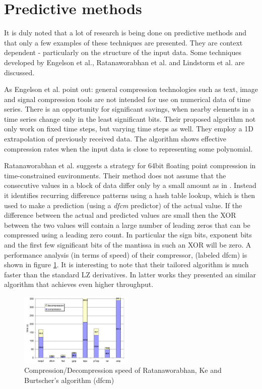 \documentclass{acm_proc_article-sp}
\begin{document}
\section{Predictive methods}
It is duly noted that a lot of research is being done on predictive methods and that only a few examples of these techniques are presented. They are context dependent - particularly on the structure of the input data. Some techniques
developed by Engelson et al., Ratanaworabhan et al. and Lindstorm et al. are discussed.

As Engelson et al. \cite{engelson2000lossless} point out: general compression technologies such as text, image and signal compression tools are not intended for use on numerical data of time 
series. There is an opportunity for significant savings, when nearby elements in a time series change only in the least significant bits. Their proposed
algorithm not only work on fixed time steps, but varying time steps as well. They employ a 1D extrapolation of previously received data. The algorithm shows effective compression 
rates when the input data is close to representing some polynomial.

Ratanaworabhan et al. \cite{1607248} suggests a strategy for 64bit floating point compression in time-constrained environments. Their method does not assume that the consecutive
values in a block of data differ only by a small amount as in \cite{engelson2000lossless}. Instead it identifies recurring difference patterns using a hash table lookup, which is then used to make a prediction (using a 
\textit{dfcm} predictor) of the actual value. If the difference between the actual and predicted values are small then the XOR between the two values will contain a large number of leading zeros that can
be compressed using a leading zero count. In particular the sign bits, exponent bits and the first few significant bits of the mantissa in such an XOR will be zero. A performance analysis (in terms of speed) of their compressor, 
(labeled dfcm) is shown in figure \ref{Ratanaworabhan2}. It is interesting to note that their tailored algorithm is much faster than the standard LZ derivatives. In latter works \cite{4589203} they presented an similar algorithm that achieves
even higher throughput.
\begin{figure}[h]
 \centering
 \includegraphics[width=0.48\textwidth]{RatanaworabhanEtAlPerformance.png}
 \caption{Compression/Decompression speed of Ratanaworabhan, Ke and Burtscher's algorithm (dfcm)\cite{1607248}}
 \label{Ratanaworabhan2}
\end{figure}
\end{document}

